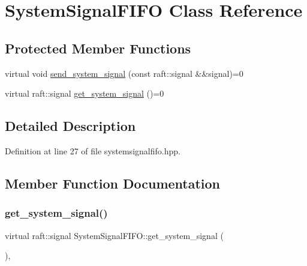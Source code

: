 \hypertarget{class_system_signal_f_i_f_o}{}\section{System\+Signal\+F\+I\+FO Class Reference}
\label{class_system_signal_f_i_f_o}
\subsection*{Protected Member Functions}
\begin{DoxyCompactItemize}
\item 
virtual void \hyperlink{class_system_signal_f_i_f_o_ad427887bcb14067abd1ca7ed8c316d4d}{send\+\_\+system\+\_\+signal} (const raft\+::signal \&\&signal)=0
\item 
virtual raft\+::signal \hyperlink{class_system_signal_f_i_f_o_a2321fb65ff3a64dd694eff891db52131}{get\+\_\+system\+\_\+signal} ()=0
\end{DoxyCompactItemize}


\subsection{Detailed Description}


Definition at line 27 of file systemsignalfifo.\+hpp.



\subsection{Member Function Documentation}
\hypertarget{class_system_signal_f_i_f_o_a2321fb65ff3a64dd694eff891db52131}{}\label{class_system_signal_f_i_f_o_a2321fb65ff3a64dd694eff891db52131} 
\subsubsection{\texorpdfstring{get\+\_\+system\+\_\+signal()}{get\_system\_signal()}}
{\footnotesize\ttfamily virtual raft\+::signal System\+Signal\+F\+I\+F\+O\+::get\+\_\+system\+\_\+signal (\begin{DoxyParamCaption}{ }\end{DoxyParamCaption})\hspace{0.3cm}{\ttfamily [protected]}, {}}


